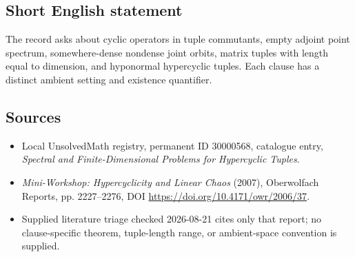 \documentclass[11pt]{article}
\begin{document}
\subsection{Short English statement}
The record asks about cyclic operators in tuple commutants, empty adjoint point spectrum, somewhere-dense nondense joint orbits, matrix tuples with length equal to dimension, and hyponormal hypercyclic tuples. Each clause has a distinct ambient setting and existence quantifier.
\subsection{Sources}
\begin{itemize}
\item Local UnsolvedMath registry, permanent ID 30000568, catalogue entry, \emph{Spectral and Finite-Dimensional Problems for Hypercyclic Tuples}.
\item \emph{Mini-Workshop: Hypercyclicity and Linear Chaos} (2007), Oberwolfach Reports, pp. 2227--2276, DOI \url{https://doi.org/10.4171/owr/2006/37}.
\item Supplied literature triage checked 2026-08-21 cites only that report; no clause-specific theorem, tuple-length range, or ambient-space convention is supplied.
\end{itemize}
\end{document}
